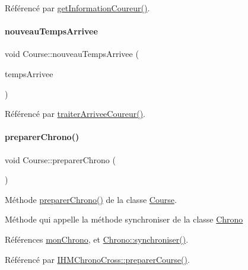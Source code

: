 Référencé par \hyperlink{class_course_a7ba5d2c9865065e95f49a24fbeec7857}{get\+Information\+Coureur()}.

\mbox{\label{class_course_abea30de9b6cec333bf19134608e5bccf}} 
\paragraph{\texorpdfstring{nouveau\+Temps\+Arrivee}{nouveauTempsArrivee}}
{\footnotesize\ttfamily void Course\+::nouveau\+Temps\+Arrivee (\begin{DoxyParamCaption}\item[{Q\+String}]{temps\+Arrivee }\end{DoxyParamCaption})\hspace{0.3cm}{\ttfamily [signal]}}



Référencé par \hyperlink{class_course_a60073d16efd4ccefa81bddb4aaa88fab}{traiter\+Arrivee\+Coureur()}.

\mbox{\label{class_course_a50596f54553b48fa29170a6b42b6e9d4}} 
\paragraph{\texorpdfstring{preparer\+Chrono()}{preparerChrono()}}
{\footnotesize\ttfamily void Course\+::preparer\+Chrono (\begin{DoxyParamCaption}{ }\end{DoxyParamCaption})}



Méthode \hyperlink{class_course_a50596f54553b48fa29170a6b42b6e9d4}{preparer\+Chrono()} de la classe \hyperlink{class_course}{Course}. 

Méthode qui appelle la méthode synchroniser de la classe \hyperlink{class_chrono}{Chrono} 

Références \hyperlink{class_course_a0c9b246b0f1ec612bd6e6c613a94d52b}{mon\+Chrono}, et \hyperlink{class_chrono_a858a209a6d366b3adb95bcf593645d6a}{Chrono\+::synchroniser()}.



Référencé par \hyperlink{class_i_h_m_chrono_cross_a4926e7524f4fd76ccceb0aef5ebcb203}{I\+H\+M\+Chrono\+Cross\+::preparer\+Course()}.


